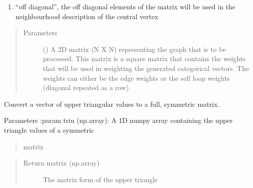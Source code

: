 \documentclass[letterpaper,10pt,english]{sphinxmanual}
\begin{document}
\begin{fulllineitems}
\begin{fulllineitems}
\begin{enumerate}
\item {} 
“off diagonal”, the off diagonal elements of the matrix will be used in the neighbourhood description
of the central vertex

\end{enumerate}
\begin{quote}\begin{description}
\item[{Parameters}] \leavevmode
\sphinxstyleliteralstrong{\sphinxupquote{(}}\sphinxstyleliteralstrong{\sphinxupquote{)}} () \textendash{} A 2D matrix (N X N) representing the graph that is to be processed. This matrix
is a square matrix that contains the weights that will be used in weighting
the generated categorical vectors. The weights can either be the edge weights
or the self loop weights (diagonal repeated as a row).

\end{description}\end{quote}

\end{fulllineitems}


\begin{fulllineitems}
\label{\detokenize{modules/gqcml.data:gqcml.data.Data.Preprocessor.triu_to_matrix}}
Convert a vector of upper triangular values to a full, symmetric matrix.

Parameters
:param triu (np.array): A 1D numpy array containing the upper triangle values of a symmetric
\begin{quote}

matrix
\end{quote}
\begin{quote}\begin{description}
\item[{Return matrix (np.array)}] \leavevmode
The matrix form of the upper triangle

\end{description}\end{quote}

\end{fulllineitems}



\end{fulllineitems}
\end{document}

